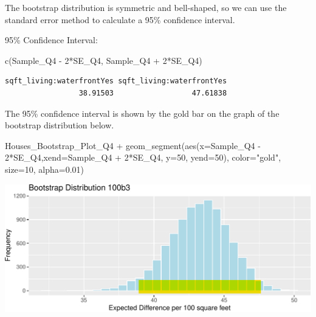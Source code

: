 \documentclass[
  letterpaper,
  DIV=11,
  numbers=noendperiod]{scrreprt}
\newenvironment{Shaded}{\begin{snugshade}}{\end{snugshade}}
\newcommand{\AttributeTok}[1]{\textcolor[rgb]{0.40,0.45,0.13}{#1}}
\newcommand{\DecValTok}[1]{\textcolor[rgb]{0.68,0.00,0.00}{#1}}
\newcommand{\FloatTok}[1]{\textcolor[rgb]{0.68,0.00,0.00}{#1}}
\newcommand{\FunctionTok}[1]{\textcolor[rgb]{0.28,0.35,0.67}{#1}}
\newcommand{\NormalTok}[1]{\textcolor[rgb]{0.00,0.23,0.31}{#1}}
\newcommand{\SpecialCharTok}[1]{\textcolor[rgb]{0.37,0.37,0.37}{#1}}
\newcommand{\StringTok}[1]{\textcolor[rgb]{0.13,0.47,0.30}{#1}}
\begin{document}
The bootstrap distribution is symmetric and bell-shaped, so we can use
the standard error method to calculate a 95\% confidence interval.

95\% Confidence Interval:

\begin{Shaded}
\begin{Highlighting}[]
\FunctionTok{c}\NormalTok{(Sample\_Q4 }\SpecialCharTok{{-}} \DecValTok{2}\SpecialCharTok{*}\NormalTok{SE\_Q4, Sample\_Q4 }\SpecialCharTok{+} \DecValTok{2}\SpecialCharTok{*}\NormalTok{SE\_Q4) }
\end{Highlighting}
\end{Shaded}

\begin{verbatim}
sqft_living:waterfrontYes sqft_living:waterfrontYes 
                 38.91503                  47.61838 
\end{verbatim}

The 95\% confidence interval is shown by the gold bar on the graph of
the bootstrap distribution below.

\begin{Shaded}
\begin{Highlighting}[]
\NormalTok{Houses\_Bootstrap\_Plot\_Q4 }\SpecialCharTok{+} 
  \FunctionTok{geom\_segment}\NormalTok{(}\FunctionTok{aes}\NormalTok{(}\AttributeTok{x=}\NormalTok{Sample\_Q4 }\SpecialCharTok{{-}} \DecValTok{2}\SpecialCharTok{*}\NormalTok{SE\_Q4,}\AttributeTok{xend=}\NormalTok{Sample\_Q4 }\SpecialCharTok{+} \DecValTok{2}\SpecialCharTok{*}\NormalTok{SE\_Q4, }\AttributeTok{y=}\DecValTok{50}\NormalTok{, }\AttributeTok{yend=}\DecValTok{50}\NormalTok{), }
               \AttributeTok{color=}\StringTok{"gold"}\NormalTok{, }\AttributeTok{size=}\DecValTok{10}\NormalTok{, }\AttributeTok{alpha=}\FloatTok{0.01}\NormalTok{) }
\end{Highlighting}
\end{Shaded}

\includegraphics{Ch3_files/figure-pdf/unnamed-chunk-175-1.pdf}
\end{document}
